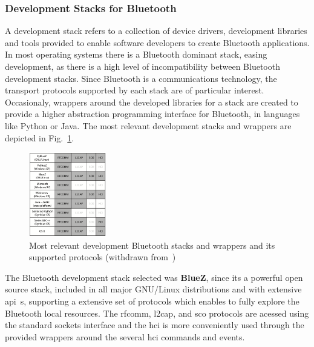 \subsubsection{Development Stacks for Bluetooth}%
\label{sec:bt-hci}
A development stack refers to a collection of device drivers, development libraries and
tools provided to enable software developers to create Bluetooth
applications. In most operating systems there is a Bluetooth dominant stack,
easing development, as there is a high level of incompatibility between
Bluetooth development stacks. Since Bluetooth is a communications technology,
the transport protocols supported by each stack are of particular
interest. Occasionaly, wrappers around the developed libraries for a stack are
created to provide a higher abstraction programming interface for Bluetooth, in
languages like Python or Java. The most relevant development stacks and wrappers
are depicted in Fig.~\ref{fig:bt-stacks}.
\begin{figure}[!hbt]
\centering
    \includegraphics[width=0.3\textwidth]{./img/bt-stacks.png}
  \caption{Most relevant development Bluetooth stacks and wrappers and its
    supported protocols (withdrawn from~\cite{huang2007bluetooth})}%
\label{fig:bt-stacks}
\end{figure}

The Bluetooth development stack selected was \textbf{BlueZ}, since its a
powerful open source stack, included in all major GNU/Linux distributions and
with extensive \gls{api}~s, supporting a extensive set of protocols which
enables to fully explore the Bluetooth local resources. The \gls{rfcomm},
\gls{l2cap}, and \gls{sco} protocols are acessed using the standard sockets
interface and the \gls{hci} is more conveniently used through the provided
wrappers around the several \gls{hci} commands and events.
%